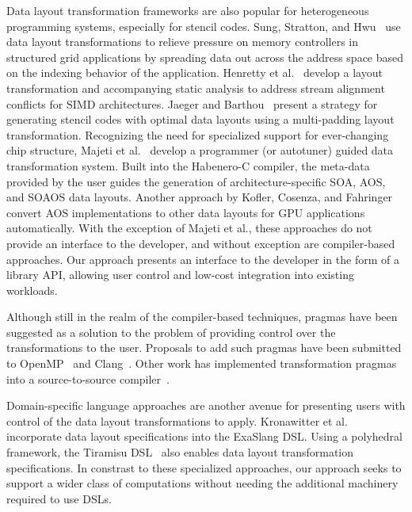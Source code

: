 \documentclass[sigconf,review=true]{acmart}
\begin{document}
Data layout transformation frameworks are also popular for heterogeneous programming systems, especially for stencil codes.
Sung, Stratton, and Hwu~\cite{sung2010data} use data layout transformations to relieve pressure on memory controllers in structured grid applications by spreading data out across the address space based on the indexing behavior of the application.
Henretty et al.~\cite{henretty2011data} develop a layout transformation and accompanying static analysis to address stream alignment conflicts for SIMD architectures.
Jaeger and Barthou~\cite{jaeger2012automatic} present a strategy for generating stencil codes with optimal data layouts using a multi-padding layout transformation.
Recognizing the need for specialized support for ever-changing chip structure, Majeti et al.~\cite{majeti2013compiler} develop a programmer (or autotuner) guided data transformation system.
Built into the Habenero-C compiler, the meta-data provided by the user guides the generation of architecture-specific SOA, AOS, and SOAOS data layouts.
Another approach by Kofler, Cosenza, and Fahringer~\cite{kofler2015automatic} convert AOS implementations to other data layouts for GPU applications automatically.  
With the exception of Majeti et al., these approaches do not provide an interface to the developer, and without exception are compiler-based approaches.
Our approach presents an interface to the developer in the form of a library API, allowing user control and low-cost integration into existing workloads.

Although still in the realm of the compiler-based techniques, pragmas have been suggested as a solution to the problem of providing control over the transformations to the user.
Proposals to add such pragmas have been submitted to OpenMP~\cite{kruse2019design} and Clang~\cite{kruse2018user}.
Other work has implemented transformation pragmas into a source-to-source compiler~\cite{xu2014semi}. 


Domain-specific language approaches are another avenue for presenting users with control of the data layout transformations to apply. 
Kronawitter et al.~\cite{kronawitter2018automatic} incorporate data layout specifications into the ExaSlang DSL.
Using a polyhedral framework, the Tiramisu DSL~\cite{baghdadi2019tiramisu} also enables data layout transformation specifications.
In constrast to these specialized approaches, our approach seeks to support a wider class of computations without needing the additional machinery required to use DSLs. 
\end{document}
